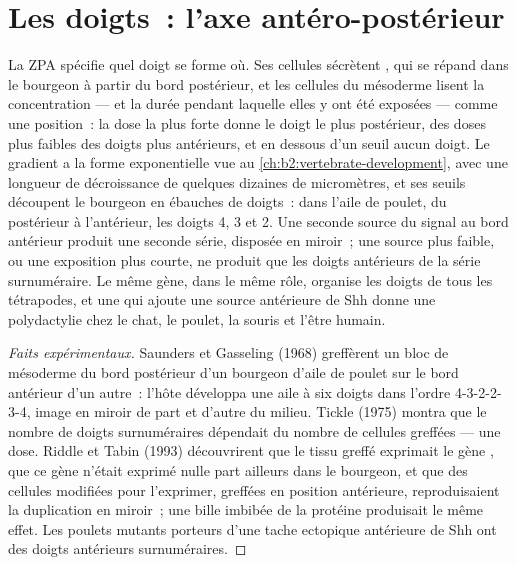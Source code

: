 \section{Les doigts~: l'axe antéro-postérieur}

\begin{proposition}\label{prop:b2:limb-organogenesis:zpa}
La ZPA spécifie quel doigt se forme où. Ses cellules sécrètent , qui se répand dans le bourgeon à partir du bord postérieur,
et les cellules du mésoderme lisent la concentration --- et la durée
pendant laquelle elles y ont été exposées --- comme une position~: la
dose la plus forte donne le doigt le plus postérieur, des doses plus
faibles des doigts plus antérieurs, et en dessous d'un seuil aucun
doigt. Le gradient a la forme exponentielle vue au
\cref{ch:b2:vertebrate-development}, avec une longueur de décroissance
de quelques dizaines de micromètres, et ses seuils découpent le
bourgeon en ébauches de doigts~: dans l'aile de poulet, du postérieur à
l'antérieur, les doigts 4, 3 et 2. Une seconde source du signal au bord
antérieur produit une seconde série, disposée en miroir~; une source
plus faible, ou une exposition plus courte, ne produit que les doigts
antérieurs de la série surnuméraire. Le même gène, dans le même rôle,
organise les doigts de tous les tétrapodes, et une  qui ajoute
une source antérieure de Shh donne une polydactylie chez le chat, le
poulet, la souris et l'être humain.
\end{proposition}
\begin{proof}[Faits expérimentaux]
Saunders et Gasseling (1968) greffèrent un bloc de mésoderme du bord
postérieur d'un bourgeon d'aile de poulet sur le bord antérieur d'un
autre~: l'hôte développa une aile à six doigts dans l'ordre 4-3-2-2-3-4,
image en miroir de part et d'autre du milieu. Tickle (1975) montra que
le nombre de doigts surnuméraires dépendait du nombre de cellules
greffées --- une dose. Riddle et Tabin (1993) découvrirent que le tissu
greffé exprimait le gène \emph{}, que ce gène n'était
exprimé nulle part ailleurs dans le bourgeon, et que des cellules
modifiées pour l'exprimer, greffées en position antérieure,
reproduisaient la duplication en miroir~; une bille imbibée de la
protéine produisait le même effet. Les poulets mutants porteurs d'une
tache ectopique antérieure de Shh ont des doigts antérieurs
surnuméraires.
\end{proof}

